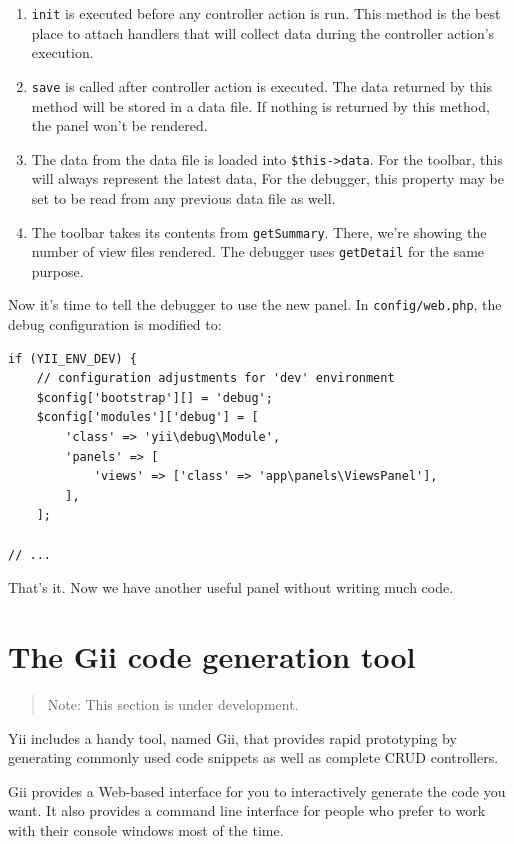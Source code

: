 \begin{enumerate}
\item \lstinline|init| is executed before any controller action is run. This method is the best place to attach handlers that will collect data during the controller action's execution.
\item \lstinline|save| is called after controller action is executed. The data returned by this method will be stored in a data file. If nothing is returned by this method, the panel
won't be rendered.
\item The data from the data file is loaded into \lstinline|$this->data|. For the toolbar, this will always represent the latest data, For the debugger, this property may be set to be read from any previous data file as well.
\item The toolbar takes its contents from \lstinline|getSummary|. There, we're showing the number of view files rendered. The debugger uses
\lstinline|getDetail| for the same purpose.
\end{enumerate}
Now it's time to tell the debugger to use the new panel. In \lstinline|config/web.php|, the debug configuration is modified to:

\lstset{language=php}\begin{lstlisting}
if (YII_ENV_DEV) {
    // configuration adjustments for 'dev' environment
    $config['bootstrap'][] = 'debug';
    $config['modules']['debug'] = [
        'class' => 'yii\debug\Module',
        'panels' => [
            'views' => ['class' => 'app\panels\ViewsPanel'],
        ],
    ];

// ...
\end{lstlisting}
That's it. Now we have another useful panel without writing much code.



\label{tool-gii.md}\section{The Gii code generation tool}
\begin{quote}Note: This section is under development.

\end{quote}
Yii includes a handy tool, named Gii, that provides rapid prototyping by generating commonly used code snippets
as well as complete CRUD controllers.

Gii provides a Web-based interface for you to interactively generate the code you want. It also provides a
command line interface for people who prefer to work with their console windows most of the time.

